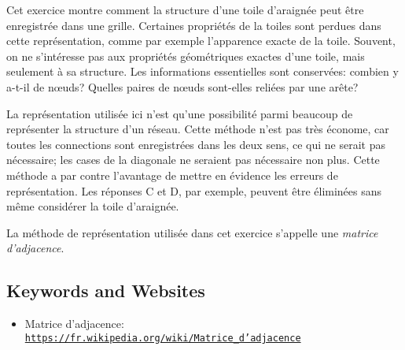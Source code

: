 \documentclass[a4paper,11pt]{report}
\newcommand{\BrochureUrlText}[1]{\texttt{#1}}
\newcommand{\taskGraphicsFolder}{..}
\begin{document}
Cet exercice montre comment la structure d’une toile d’araignée peut être enregistrée dans une grille. Certaines propriétés de la toiles sont perdues dans cette représentation, comme par exemple l’apparence exacte de la toile. Souvent, on ne s’intéresse pas aux propriétés géométriques exactes d’une toile, mais seulement à sa structure. Les informations essentielles sont conservées: combien y a-t-il de nœuds? Quelles paires de nœuds sont-elles reliées par une arête?

{\centering%
\par}

La représentation utilisée ici n’est qu’une possibilité parmi beaucoup de représenter la structure d’un réseau. Cette méthode n’est pas très économe, car toutes les connections sont enregistrées dans les deux sens, ce qui ne serait pas nécessaire; les cases de la diagonale ne seraient pas nécessaire non plus. Cette méthode a par contre l’avantage de mettre en évidence les erreurs de représentation. Les réponses C et D, par exemple, peuvent être éliminées sans même considérer la toile d’araignée.

La méthode de représentation utilisée dans cet exercice s’appelle une \emph{matrice d’adjacence}.

{\raggedright

\subsection*{Keywords and Websites}

\begin{itemize}
  \item Matrice d’adjacence: \href{https://fr.wikipedia.org/wiki/Matrice_d\%27adjacence}{\BrochureUrlText{https://fr.wikipedia.org/wiki/Matrice\_d’adjacence}}
\end{itemize}


}
\end{document}
